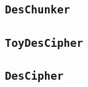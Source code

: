 
\subsection{\texttt{DesChunker}}
\subsection{\texttt{ToyDesCipher}}
\subsection{\texttt{DesCipher}}
